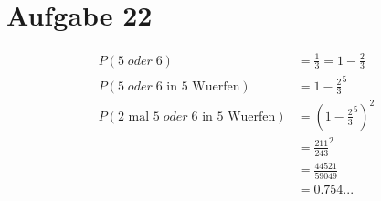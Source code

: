 \documentclass[a4paper]{scrartcl}
\begin{document}
\section*{Aufgabe 22}
\begin{align*}
	P(5\;oder\;6) &=  \frac{1}{3} = 1- \frac{2}{3}\\
	P(5\;oder\;6\text{ in 5 Wuerfen}) &= 1-\frac{2}{3}^5\\
	P(\text{2 mal }5\;oder\;6\text{ in 5 Wuerfen}) &= (1-\frac{2}{3}^5)^2\\
	&= \frac{211}{243}^2\\
	& = \frac{44521}{59049}\\
	& = 0.754...
\end{align*}
\end{document}
